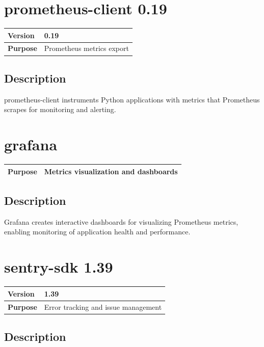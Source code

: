 \documentclass[12pt,a4paper]{report}
\begin{document}
\section{prometheus-client 0.19}

\begin{tabular}{|p{4cm}|p{10cm}|}
\hline
\textbf{Version} & 0.19 \\
\hline
\textbf{Purpose} & Prometheus metrics export \\
\hline
\end{tabular}

\subsection{Description}

prometheus-client instruments Python applications with metrics that Prometheus scrapes for monitoring and alerting.

\section{grafana}

\begin{tabular}{|p{4cm}|p{10cm}|}
\hline
\textbf{Purpose} & Metrics visualization and dashboards \\
\hline
\end{tabular}

\subsection{Description}

Grafana creates interactive dashboards for visualizing Prometheus metrics, enabling monitoring of application health and performance.

\section{sentry-sdk 1.39}

\begin{tabular}{|p{4cm}|p{10cm}|}
\hline
\textbf{Version} & 1.39 \\
\hline
\textbf{Purpose} & Error tracking and issue management \\
\hline
\end{tabular}

\subsection{Description}
\end{document}
